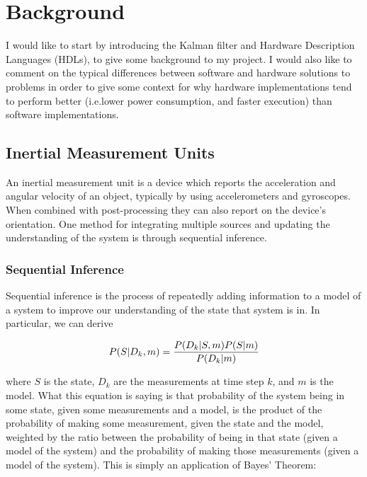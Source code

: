 \documentclass[12pt]{article}
\begin{document}
\section{Background}

I would like to start by introducing the Kalman filter and Hardware Description Languages (HDLs), to give some background to my project. I would also like to comment on the typical differences between software and hardware solutions to problems in order to give some context for why hardware implementations tend to perform better (i.e.\@ lower power consumption, and faster execution) than software implementations.

\subsection{Inertial Measurement Units}

An inertial measurement unit is a device which reports the acceleration and angular velocity of an object, typically by using accelerometers and gyroscopes. When combined with post-processing they can also report on the device's orientation. One method for integrating multiple sources and updating the understanding of the system is through sequential inference.

\subsubsection{Sequential Inference}

Sequential inference \cite{morrison_2016} is the process of repeatedly adding information to a model of a system to improve our understanding of the state that system is in. In particular, we can derive \cite{morrison_2016}

\begin{equation}
	\label{si}
	P(S | D_k, m) = {P(D_k | S, m) P(S | m) \over P(D_k | m)}
\end{equation}

\noindent where $S$ is the state, $D_k$ are the measurements at time step $k$, and $m$ is the model. What this equation is saying is that probability of the system being in some state, given some measurements and a model, is the product of the probability of making some measurement, given the state and the model, weighted by the ratio between the probability of being in that state (given a model of the system) and the probability of making those measurements (given a model of the system). This is simply an application of Bayes' Theorem:
\end{document}
